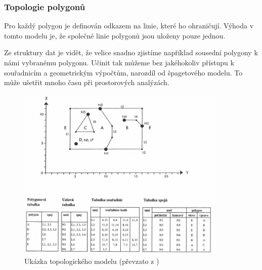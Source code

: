 \subsubsection{Topologie polygonů}
Pro každý polygon je definován odkazem na linie, které ho
ohraničují. Výhoda v tomto modelu je, že společné linie polygonů jsou
uloženy pouze jednou.
	
Ze struktury dat je vidět, že velice snadno zjistíme například
sousední polygony k námi vybranému polygonu. Učinit tak můžeme bez
jakéhokoliv přístupu k souřadnicím a geometrickým výpočtům, narozdíl
od špagetového modelu. To může ušetřit mnoho času při prostorových
analýzách.

\begin{figure}[h]
  \centering
  \includegraphics[width=10cm]{./pictures/3/topo_model.png}
  \caption{Ukázka topologického modelu (převzato z \cite{kolar2003geograficke})}
  \label{fig:3-time_complexity}
\end{figure}
